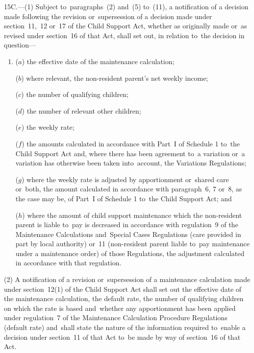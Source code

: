 \documentclass[12pt,a4paper]{article}
\begin{document}
15C.---(1)  Subject to~paragraphs~(2) and~(5) to~(11), a notification of a decision made following the revision or~supersession of a decision made under section~11,~12 or~17 of the Child Support Act, whether as originally made or~as revised under section~16 of that Act, shall set out, in relation to~the decision in question—
\begin{enumerate}\item[]
($a$) the effective date of the maintenance calculation;

($b$) where relevant, the non-resident parent’s net weekly income;

($c$) the number of qualifying children;

($d$) the number of relevant other children;

($e$) the weekly rate;

($f$) the amounts calculated in accordance with Part~I of Schedule 1 to~the Child Support Act and, where there has been agreement to~a variation or~a variation has otherwise been taken into~account, the Variations Regulations;

($g$) where the weekly rate is adjusted by apportionment or~shared care or~both, the amount calculated in accordance with paragraph~6, 7 or~8, as the case may be, of Part~I of Schedule 1 to~the Child Support Act; and

($h$) where the amount of child support maintenance which the non-resident parent is liable to~pay is decreased in accordance with regulation~9 of the Maintenance Calculations and~Special Cases Regulations (care provided in part by local authority) or~11 (non-resident parent liable to~pay maintenance under a maintenance order) of those Regulations, the adjustment calculated in accordance with that regulation.
\end{enumerate}

(2) A notification of a revision or~supersession of a maintenance calculation made under section~12(1) of the Child Support Act shall set out the effective date of the maintenance calculation, the default rate, the number of qualifying children on which the rate is based and~whether any apportionment has been applied under regulation~7 of the Maintenance Calculation Procedure Regulations (default rate) and~shall state the nature of the information required to~enable a decision under section~11 of that Act to~be made by way of section~16 of that Act.
\end{document}
